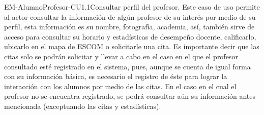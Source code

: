 \begin{UseCase}{EM-AlumnoProfesor-CU1.1}{Consultar perfil del profesor.}{
	\noindent
	Este caso de uso permite al actor consultar la información de algún
	profesor de su interés por medio de su perfil, esta información es su
	nombre, fotografía, academia, así, también sirve de acceso para consultar
	su horario y estadísticas de desempeño docente, calificarlo, ubicarlo en
	el mapa de ESCOM o solicitarle una cita. Es importante decir que las citas
	solo se podrán solicitar y llevar a cabo en el caso en el que el profesor
	consultado esté registrado en el sistema, pues, aunque se cuenta de igual
	forma con su información básica, es necesario el registro de éste para
	lograr la interacción con los alumnos por medio de las citas. En el caso
	en el cual el profesor no se encuentra registrado, se podrá consultar aún
	su información antes mencionada (exceptuando las citas y estadísticas). 
	\newline
	}
\end{UseCase}

